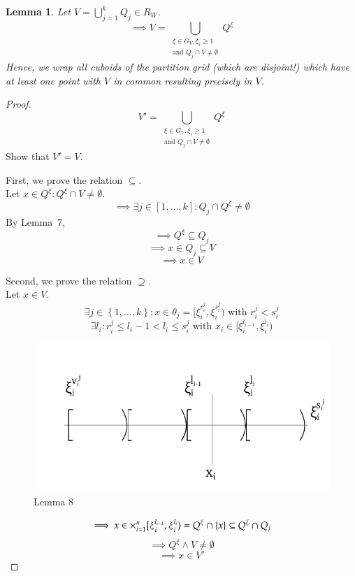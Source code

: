 \documentclass{article}
\newtheorem{lemma}{Lemma}  \numberwithin{lemma}{section}
\newcommand{\set}[1]{\left\{#1\right\}}
\begin{document}
\begin{lemma}
  \label{l:eight}
  Let $V = \bigcup_{j=1}^{k} Q_j \in R_W$.
  \[ \implies V = \bigcup_{\substack{\xi \in G_V, \xi_i \geq 1 \\ \text{and } Q_j \cap V \neq \emptyset}} Q^\xi \]
  Hence, we wrap all cuboids of the partition grid (which are disjoint!)
  which have at least one point with $V$ in common resulting precisely in $V$.
\end{lemma}
\begin{proof}
  \[ V' = \bigcup_{\substack{\xi \in G_V, \xi_i \geq 1 \\ \text{and } Q_j \cap V \neq \emptyset}} Q^\xi \]
  Show that $V' = V$.

  First, we prove the relation $\subseteq$. \\
  Let $x \in Q^\xi: Q^\xi \cap V \neq \emptyset$.
  \[ \implies \exists j \in [1,\ldots,k]: Q_j \cap Q^\xi \neq \emptyset \]
  By Lemma~7,
  \[ \implies Q^\xi \subseteq Q_j \]
  \[ \implies x \in Q_j \subseteq V \]
  \[ \implies x \in V \]

  Second, we prove the relation $\supseteq$. \\
  Let $x \in V$.
  \[ \exists j \in \set{1,\ldots,k}: x \in \theta_j = [\xi_i^{r_i^j}, \xi_i^{s_i^j}) \text{ with } r_i^j < s_i^j \]
  \[ \exists l_i: r_i^j \leq l_i - 1 < l_i \leq s_i^j \text{ with } x_i \in [\xi_{i}^{l_{i-1}}, \xi_i^{l_i}) \]

  \begin{figure}[!h]
    \begin{center}
      \includegraphics{img/08_lemma8.pdf}
      \caption{Lemma 8}
    \end{center}
  \end{figure}

  \[ \implies x \in \huge\times_{i=1}^{n} [\xi_i^{l_{i-1}}, \xi_i^{l_i}) = Q^\xi \cap \set{x} \subseteq Q^\xi \cap Q_j \]
  \[ \implies Q^\xi \land V \neq \emptyset \]
  \[ \implies x \in V' \]
\end{proof}
\end{document}
